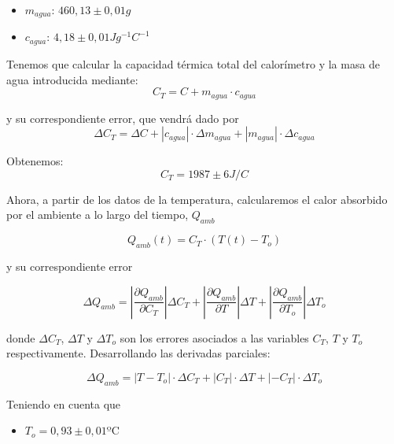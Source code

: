 \documentclass[a4paper,12pt,spanish]{article}
\begin{document}
	\begin{itemize}
		\item $m_{agua}$: $460,13 \pm 0,01 \si{g}$
		\item $c_{agua}$: $4,18\pm 0,01 \si{Jg^{-1}C^{-1}}$
	\end{itemize}
	
	
	Tenemos que calcular la capacidad térmica total del calorímetro y la masa de agua introducida mediante:
	\[ C_T = C + m_{agua}\cdot c_{agua}
	\]
	
	y su correspondiente error, que vendrá dado por 
	\[  \Delta C_T = \Delta C + |c_{agua}| \cdot \Delta m_{agua} + |m_{agua}| \cdot \Delta c_{agua}  \]
	
	Obtenemos:
	\[ \boxed{C_T = 1987 \pm 6 \si{J/C}}\]	
	
	
	Ahora, a partir de los datos de la temperatura, calcularemos el calor absorbido por el ambiente a lo largo del tiempo, $Q_{amb}$
	
	\[ Q_{amb}(t) = C_T \cdot (T(t)-T_o)
	\]
	
	y su correspondiente error
	
	\[\Delta Q_{amb} = \left|\frac{\partial Q_{amb}}{\partial C_T}\right|\Delta C_T + \left|\frac{\partial Q_{amb}}{\partial T}\right|\Delta T + \left|\frac{\partial Q_{amb}}{\partial T_o}\right|\Delta T_o\]
	
	donde $\Delta C_T$, $\Delta T$ y $\Delta T_o$ son los errores asociados a las variables $C_T$, $T$ y $T_o$ respectivamente. Desarrollando las derivadas parciales:
	
	\[\Delta Q_{amb} = |T-T_o|\cdot\Delta C_T + |C_T|\cdot\Delta T + |-C_T|\cdot\Delta T_o\]
	
	
	Teniendo en cuenta que 
	\begin{itemize}
		\item $  T_o = 0,93\pm 0,01 \text{ºC}  $
	\end{itemize}
	
	
	
\end{document}
